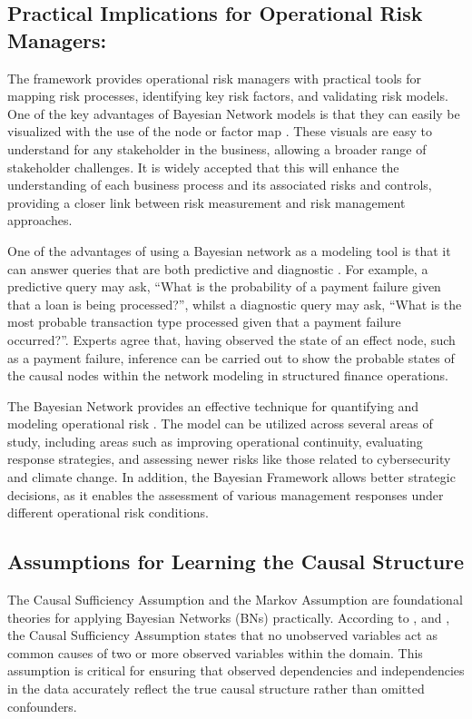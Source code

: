 \subsection{Practical Implications for Operational Risk Managers:}
The framework provides operational risk managers with practical tools for mapping risk processes, identifying key risk factors, and validating risk models. One of the key advantages of Bayesian Network models is that they can easily be visualized with the use of the node or factor map \parencite{article}. These visuals are easy to understand for any stakeholder in the business, allowing a broader range of stakeholder challenges. It is widely accepted that this will enhance the understanding of each business process and its associated risks and controls, providing a closer link between risk measurement and risk management approaches.

One of the advantages of using a Bayesian network as a modeling tool is that it can answer queries that are both predictive and diagnostic \parencite{sanford_bayesian_2012}. For example, a predictive query may ask, “What is the probability of a payment failure given that a loan is being processed?”, whilst a diagnostic query may ask, “What is the most probable transaction type processed given that a payment failure occurred?”. Experts agree that, having observed the state of an effect node, such as a payment failure, inference can be carried out to show the probable states of the causal nodes within the network modeling in structured finance operations. 

The Bayesian Network provides an effective technique for quantifying and modeling operational risk \parencite{zhao_data_2024}. The model can be utilized across several areas of study, including areas such as improving operational continuity, evaluating response strategies, and assessing newer risks like those related to cybersecurity and climate change. In addition, the Bayesian Framework allows better strategic decisions, as it enables the assessment of various management responses under different operational risk conditions.
 
\subsection{Assumptions for Learning the Causal Structure}
The Causal Sufficiency Assumption and the Markov Assumption are foundational theories for applying Bayesian Networks (BNs) practically. According to \textcite{Chobtham2020}, and \textcite{Wu2023}, the Causal Sufficiency Assumption states that no unobserved variables act as common causes of two or more observed variables within the domain. This assumption is critical for ensuring that observed dependencies and independencies in the data accurately reflect the true causal structure rather than omitted confounders.

